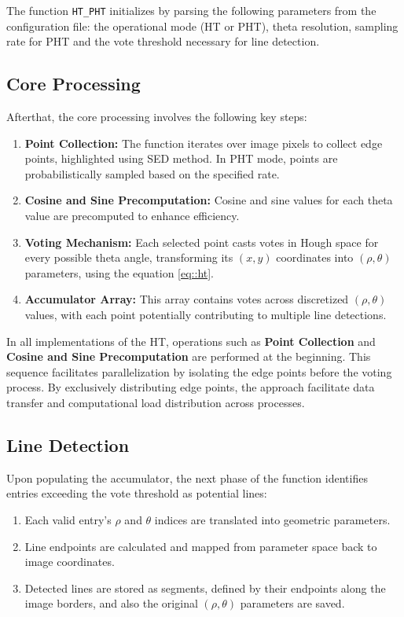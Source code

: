 \documentclass[conference]{IEEEtran}
\begin{document}
        The function \texttt{HT\_PHT} initializes by parsing the following parameters from the configuration file: the operational mode (HT or PHT), theta resolution, sampling rate for PHT and the vote threshold necessary for line detection.

    \subsection{Core Processing}
    \label{subsec:core_processing}

        Afterthat, the core processing involves the following key steps:
    
        \begin{enumerate}
            \item \textbf{Point Collection:} The function iterates over image pixels to collect edge points, highlighted using SED method. In PHT mode, points are probabilistically sampled based on the specified rate.
            \item \textbf{Cosine and Sine Precomputation:} Cosine and sine values for each theta value are precomputed to enhance efficiency.
            \item \textbf{Voting Mechanism:} Each selected point casts votes in Hough space for every possible theta angle, transforming its $(x, y)$ coordinates into $(\rho, \theta)$ parameters, using the equation \ref{eq::ht}.
            \item \textbf{Accumulator Array:} This array contains votes across discretized $(\rho, \theta)$ values, with each point potentially contributing to multiple line detections.
        \end{enumerate}

        In all implementations of the HT, operations such as \textbf{Point Collection} and \textbf{Cosine and Sine Precomputation} are performed at the beginning. This sequence facilitates parallelization by isolating the edge points before the voting process. By exclusively distributing edge points, the approach facilitate data transfer and computational load distribution across processes.
        
    \subsection{Line Detection}
    \label{subsec:line_detection}

        Upon populating the accumulator, the next phase of the function identifies entries exceeding the vote threshold as potential lines:
        \begin{enumerate}
            \item Each valid entry's $\rho$ and $\theta$ indices are translated into geometric parameters.
            \item Line endpoints are calculated and mapped from parameter space back to image coordinates.
            \item Detected lines are stored as segments, defined by their endpoints along the image borders, and also the original $(\rho, \theta)$ parameters are saved.
        \end{enumerate}
\end{document}
